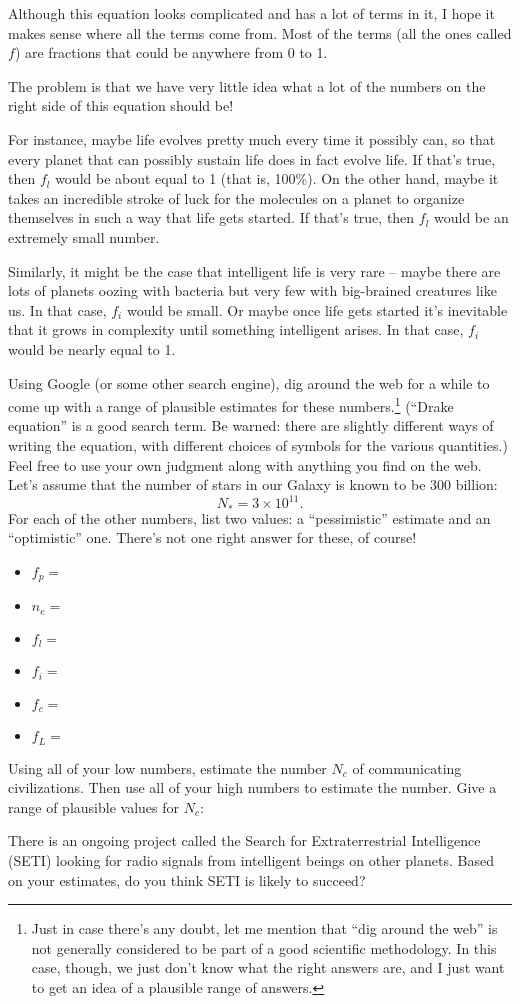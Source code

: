 Although this equation looks complicated and 
has a lot of terms in it, I hope it makes sense where all the terms come from.
Most of the terms (all the ones called $f$) are fractions that could
be anywhere from 0 to 1.

The problem is that we have very little idea what a lot of the numbers
on the right side of this equation should be!  

For instance, maybe
life evolves pretty much every time it possibly can, so that every
planet that can possibly sustain life does in fact evolve life.
If that's true, then $f_l$ would be about equal to 1 (that is, 100\%).  
On the other hand,
maybe it takes an incredible stroke of luck for the molecules on a planet
to organize themselves in such a way that life gets started.  If that's
true, then $f_l$ would be an extremely small number.

Similarly, it might be the case that intelligent life is very rare
-- maybe there are lots of planets oozing with bacteria but very few
with big-brained creatures like us.  In that case, $f_i$ would be small.
Or maybe once life gets started it's inevitable that it grows in complexity
until something intelligent arises.  In that case, $f_i$ would be nearly equal
to 1.

\pagebreak[2]

Using Google (or some other search engine), dig around the web for a while
to come up with a range of plausible estimates for these numbers.\footnote{Just
in case there's any doubt, let me mention that ``dig around the web''
is not generally considered to be part of a good scientific methodology.
In this case, though, we just don't know what the right answers are,
and I just want to get an idea of a plausible range of answers.}
  (``Drake
equation'' is a good search term.  Be warned: there are slightly
different ways of writing the equation, with different choices
of symbols for the various quantities.)  Feel free to use your own
judgment along with anything you find on the web.
Let's assume
that the number of stars in our Galaxy is known to be 300 billion:
$$
N_*=3\times 10^{11}.
$$
For each of the other numbers, list two values: a ``pessimistic'' estimate
and an ``optimistic'' one.  There's not one right answer for these,
of course!

\begin{itemize}
\item $f_p=$
\item $n_e=$
\item $f_l=$
\item $f_i=$
\item $f_c=$ 
\item $f_L=$ 
\end{itemize}

Using all of your low numbers, estimate the number $N_c$ of communicating
civilizations.  Then use all of your high numbers to estimate the number.
Give a range of plausible values for $N_c$:

\answerspace{1in}

There is an ongoing project called the Search for Extraterrestrial
Intelligence (SETI) looking for radio signals from intelligent beings
on other planets.  Based on your estimates, do you think SETI is likely
to succeed?  

